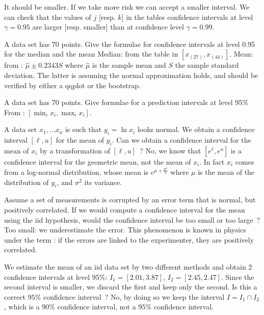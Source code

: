  {It should be smaller. If we take more risk we can accept a smaller interval.
We can check that the values of $j$ [resp. $k$] in the tables
confidence intervals at level $\gamma=0.95$ are larger [resp.
smaller] than at confidence level $\gamma=0.99$.}


 {A data set has 70 points. Give the formulae
 for confidence intervals at level 0.95 for the median and the mean}
 {Median: from the table in 
 $[x_{(27)},x_{(44)}]$. Mean: from :
 $\hat{\mu} \pm 0.2343 S$ where $\hat{\mu}$ is the sample mean and
 $S$ the sample standard deviation. The latter is assuming the normal approximation holds, and should be verified by either
 a qqplot or the bootstrap.}

 {A data set has 70 points. Give formulae
 for a prediction intervals at level 95\%}
 {From : $[\min_i x_i, \max_i x_i]$.}

 {A data set $x_1, ...x_n$ is such that $y_i=\ln x_i$ looks normal. We obtain a confidence interval $[\ell, u]$ for the mean of $y_i$.
 Can we obtain a confidence interval for the mean of $x_i$ by a transformation of  $[\ell, u]$~?}
 {No, we know that $[e^{\ell}, e^{u}]$ is a confidence interval for the geometric mean, not the mean of $x_i$. In fact
 $x_i$ comes from a log-normal distribution, whose mean is $e^{\mu +
 \frac{\sigma^2}{2}}$ where $\mu$ is the mean of the distribution
 of $y_i$, and $\sigma^2$ its variance.}

 {Assume a set of measurements is corrupted by an error term that is normal, but positively correlated. If we would compute
 a confidence interval for the mean using the iid hypothesis, would the confidence interval be too small or too large~?}
 {Too small: we underestimate the error. This phenomenon is known in physics under
 the term : if the errors are linked to the experimenter, they are positively
 correlated.}


 {We estimate the mean of an iid data set by two different methods and obtain 2 confidence
 intervals at level $95\%$: $I_1=[2.01, 3.87]$, $I_2=[2.45, 2.47]$. Since the second interval is smaller, we
 discard the first and keep only the second. Is this a correct $95\%$ confidence interval~?}
 {No, by doing so we keep the interval $I=I_1 \cap I_2$, which is a $90\%$ confidence interval, not a $95\%$ confidence interval.}
